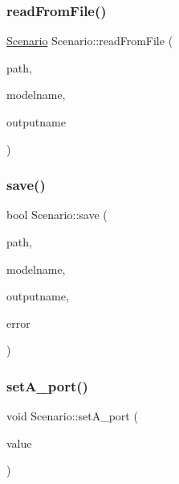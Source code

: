 \subsubsection{\texorpdfstring{readFromFile()}{readFromFile()}}
{\footnotesize\ttfamily \mbox{\hyperlink{class_scenario}{Scenario}} Scenario\+::read\+From\+File (\begin{DoxyParamCaption}\item[{Q\+String}]{path,  }\item[{Q\+String}]{modelname,  }\item[{Q\+String}]{outputname }\end{DoxyParamCaption})\hspace{0.3cm}{\ttfamily [static]}}

\mbox{\label{class_scenario_a3b2b03b282763b6b245c40815acbc1a0}} 
\subsubsection{\texorpdfstring{save()}{save()}}
{\footnotesize\ttfamily bool Scenario\+::save (\begin{DoxyParamCaption}\item[{Q\+String}]{path,  }\item[{Q\+String}]{modelname,  }\item[{Q\+String}]{outputname,  }\item[{Q\+String $\ast$}]{error }\end{DoxyParamCaption})}

\mbox{\label{class_scenario_a336d8bc6adc7aef5c764d461d43ed4a6}} 
\subsubsection{\texorpdfstring{setA\_port()}{setA\_port()}}
{\footnotesize\ttfamily void Scenario\+::set\+A\+\_\+port (\begin{DoxyParamCaption}\item[{\mbox{\hyperlink{classtypes_1_1_node_id}{types\+::\+Node\+Id}}}]{value }\end{DoxyParamCaption})}

\mbox{\label{class_scenario_aa1da7e8240a6826c070307974f821dd3}} 
